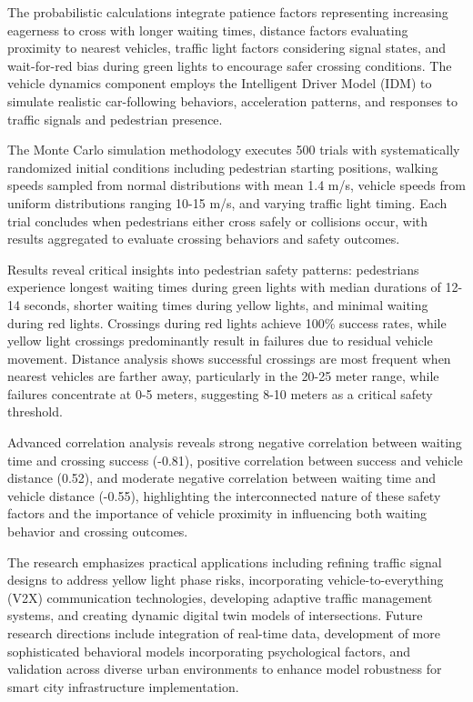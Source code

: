\documentclass[a4paper, 12pt]{report}
\begin{document}
The probabilistic calculations integrate patience factors representing increasing eagerness to cross with longer waiting times, distance factors evaluating proximity to nearest vehicles, traffic light factors considering signal states, and wait-for-red bias during green lights to encourage safer crossing conditions. The vehicle dynamics component employs the Intelligent Driver Model (IDM) to simulate realistic car-following behaviors, acceleration patterns, and responses to traffic signals and pedestrian presence.

The Monte Carlo simulation methodology executes 500 trials with systematically randomized initial conditions including pedestrian starting positions, walking speeds sampled from normal distributions with mean 1.4 m/s, vehicle speeds from uniform distributions ranging 10-15 m/s, and varying traffic light timing. Each trial concludes when pedestrians either cross safely or collisions occur, with results aggregated to evaluate crossing behaviors and safety outcomes.

Results reveal critical insights into pedestrian safety patterns: pedestrians experience longest waiting times during green lights with median durations of 12-14 seconds, shorter waiting times during yellow lights, and minimal waiting during red lights. Crossings during red lights achieve 100\% success rates, while yellow light crossings predominantly result in failures due to residual vehicle movement. Distance analysis shows successful crossings are most frequent when nearest vehicles are farther away, particularly in the 20-25 meter range, while failures concentrate at 0-5 meters, suggesting 8-10 meters as a critical safety threshold.

Advanced correlation analysis reveals strong negative correlation between waiting time and crossing success (-0.81), positive correlation between success and vehicle distance (0.52), and moderate negative correlation between waiting time and vehicle distance (-0.55), highlighting the interconnected nature of these safety factors and the importance of vehicle proximity in influencing both waiting behavior and crossing outcomes.

The research emphasizes practical applications including refining traffic signal designs to address yellow light phase risks, incorporating vehicle-to-everything (V2X) communication technologies, developing adaptive traffic management systems, and creating dynamic digital twin models of intersections. Future research directions include integration of real-time data, development of more sophisticated behavioral models incorporating psychological factors, and validation across diverse urban environments to enhance model robustness for smart city infrastructure implementation.
\end{document}
